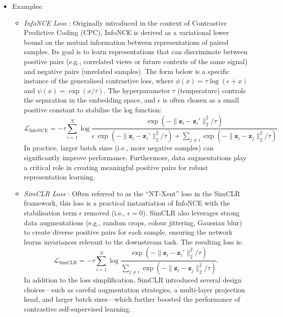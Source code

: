 \begin{itemize}
\begin{itemize}
        \item Examples:
        \begin{itemize}
            \item \emph{InfoNCE Loss} \citep{oord2018representation}: Originally introduced in the context of Contrastive Predictive Coding (CPC), InfoNCE is derived as a variational lower bound on the mutual information between representations of paired samples. Its goal is to learn representations that can discriminate between positive pairs (e.g., correlated views or future contexts of the same signal) and negative pairs (unrelated samples). The form below is a specific instance of the generalised contrastive loss, where \(\phi(x) = \tau \log(\epsilon + x)\) and \(\psi(x) = \exp(x / \tau)\). The hyperparameter \(\tau\) (temperature) controls the separation in the embedding space, and \(\epsilon\) is often chosen as a small positive constant to stabilise the log function:
              \[
                \mathcal{L}_{\text{InfoNCE}} 
                = -\tau \sum_{i=1}^{N} \log 
                \frac{\exp\left(-\|\mathbf{z}_i - \mathbf{z}_i'\|_2^2 / \tau\right)}
                {\epsilon \,\exp\left(-\|\mathbf{z}_i - \mathbf{z}_i'\|_2^2 / \tau\right) 
                + \sum_{j \neq i} \exp\left(-\|\mathbf{z}_i - \mathbf{z}_j\|_2^2 / \tau\right)}.
              \]
              In practice, larger batch sizes (i.e., more negative samples) can significantly improve performance. Furthermore, data augmentations play a critical role in creating meaningful positive pairs for robust representation learning.
        
            \item \emph{SimCLR Loss} \citep{chen2020simple}: Often referred to as the “NT-Xent” loss in the SimCLR framework, this loss is a practical instantiation of InfoNCE with the stabilisation term \(\epsilon\) removed (i.e., \(\epsilon = 0\)). SimCLR also leverages strong data augmentations (e.g., random crops, colour jittering, Gaussian blur) to create diverse positive pairs for each sample, ensuring the network learns invariances relevant to the downstream task. The resulting loss is:
              \[
                \mathcal{L}_{\text{SimCLR}} 
                = -\tau \sum_{i=1}^{N} \log 
                \frac{\exp\left(-\|\mathbf{z}_i - \mathbf{z}_i'\|_2^2 / \tau\right)}
                {\sum_{j \neq i} \exp\left(-\|\mathbf{z}_i - \mathbf{z}_j\|_2^2 / \tau\right)}.
              \]
              In addition to the loss simplification, SimCLR introduced several design choices—such as careful augmentation strategies, a multi-layer projection head, and larger batch sizes—which further boosted the performance of contrastive self-supervised learning.
        

\end{itemize}
\end{itemize}
\end{itemize}

